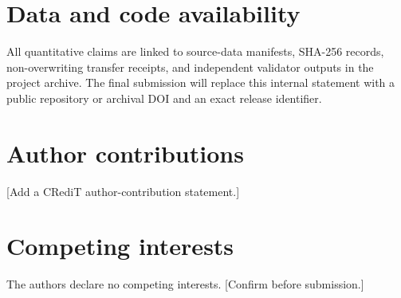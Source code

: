 \documentclass[
  aps,
  prb,
  reprint,
  amsmath,
  amssymb,
  superscriptaddress,
  longbibliography,
  nofootinbib,
  floatfix,
  showkeys
]{revtex4-2}
\begin{document}






\section*{Data and code availability}
All quantitative claims are linked to source-data manifests, SHA-256 records, non-overwriting transfer receipts, and independent validator outputs in the project archive.
The final submission will replace this internal statement with a public repository or archival DOI and an exact release identifier.

\begin{acknowledgments}
\end{acknowledgments}

\section*{Author contributions}
[Add a CRediT author-contribution statement.]

\section*{Competing interests}
The authors declare no competing interests. [Confirm before submission.]

\clearpage

\end{document}
